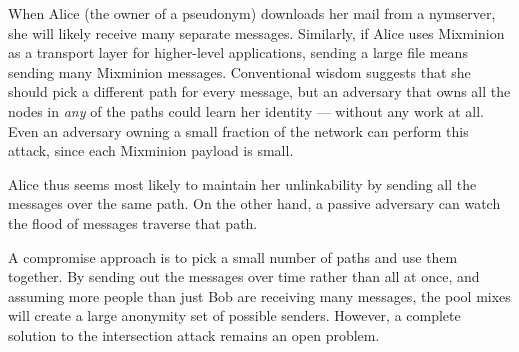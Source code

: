 \documentclass[11pt]{IEEEtran}
\begin{document}
When Alice (the owner of a pseudonym) downloads her mail from a
nymserver, she will likely receive many separate messages. Similarly, if
Alice uses Mixminion as a transport layer for higher-level applications,
sending a large file means sending many Mixminion messages.
Conventional wisdom suggests that she should pick a different
path for every message, but an adversary that owns all the nodes in
\emph{any} of the paths could learn her identity --- without any work
at all. Even an adversary owning a small fraction of the network
can perform this attack, since each Mixminion payload is small.


Alice thus seems most likely to maintain her unlinkability by sending all
the messages over the same path. On the other hand, a passive adversary
can watch the flood of messages traverse that path.

A compromise approach is to pick a small number of paths and use them
together. By sending out the messages over time rather than all at once,
and assuming more people than just Bob are receiving many messages,
the pool mixes will create a large anonymity set of possible senders.
However, a complete solution to the intersection attack remains an
open problem.




\end{document}
